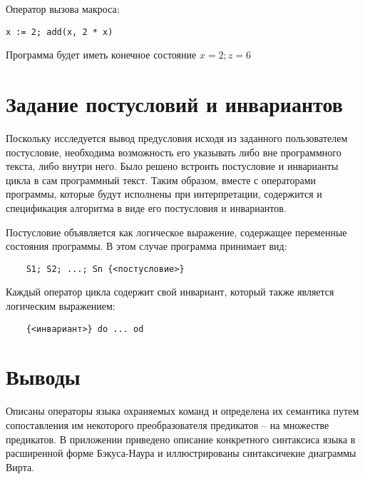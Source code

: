 Оператор вызова макроса:

\begin{verbatim}
x := 2; add(x, 2 * x)
\end{verbatim}

Программа будет иметь конечное состояние $x = 2; z = 6$

\section{Задание постусловий и инвариантов}
Поскольку исследуется вывод предусловия исходя из заданного пользователем постусловие, необходима
возможность его указывать либо вне программного текста, либо внутри него. Было решено
встроить постусловие и инварианты цикла в сам программный текст. Таким образом,
вместе с операторами программы, которые будут исполнены при интерпретации, содержится и
спецификация алгоритма в виде его постусловия и инвариантов. 

Постусловие объявляется как логическое выражение, содержащее переменные состояния программы. В этом случае программа
принимает вид:
\begin{verbatim}
	S1; S2; ...; Sn {<постусловие>}
\end{verbatim}

Каждый оператор цикла содержит свой инвариант, который также является логическим выражением:
\begin{verbatim}
	{<инвариант>} do ... od
\end{verbatim}

\section{Выводы} \label{ch2:conclusion}
Описаны операторы языка охраняемых команд и определена их семантика путем
сопоставления им некоторого преобразователя предикатов -- на множестве предикатов.
В приложении приведено описание конкретного синтаксиса языка в расширенной форме Бэкуса-Наура и иллюстрированы синтаксичекие диаграммы Вирта.
%
